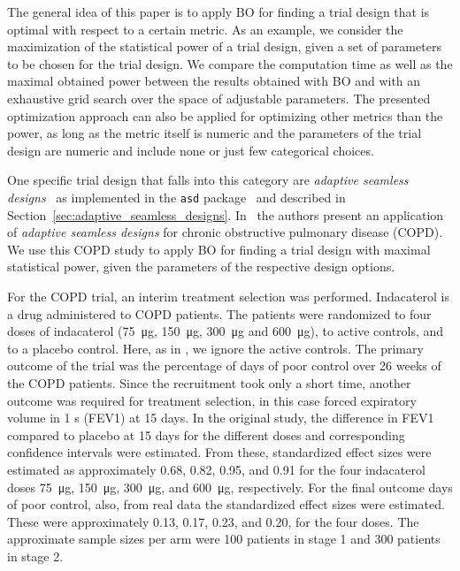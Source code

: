 \documentclass[bimj,fleqn]{w-art}
\theoremstyle{plain}
\theoremstyle{definition}
\begin{document}
The general idea of this paper is to apply BO for finding a trial design that is optimal with respect to a certain metric.
As an example, we consider the maximization of the statistical power of a trial design, given a set of parameters to be chosen for the trial design.
We compare the computation time as well as the maximal obtained power between the results obtained with BO and with an exhaustive grid search over the space of adjustable parameters.
The presented optimization approach can also be applied for optimizing other metrics than the power, as long as the metric itself is numeric and the parameters of the trial design are numeric and include none or just few categorical choices.

One specific trial design that falls into this category are \emph{adaptive seamless designs}~\citep{barnes_integrating_2010} as implemented in the \texttt{asd} package~\citep{parsons_package_2012} and described in Section~\ref{sec:adaptive_seamless_designs}.
In~\citet{friede_adaptive_2020} the authors present an application of \emph{adaptive seamless designs} for chronic obstructive pulmonary disease (COPD).
We use this COPD study to apply BO for finding a trial design with maximal statistical power, given the parameters of the respective design options.


For the COPD trial, an interim treatment selection was performed. 
Indacaterol is a drug administered to COPD patients.
The patients were randomized to four doses of indacaterol (\SI{75}{\micro\gram}, \SI{150}{\micro\gram}, \SI{300}{\micro\gram} and \SI{600}{\micro\gram}), to active controls, and to a placebo control.
Here, as in \citet{friede_adaptive_2020}, we ignore the active controls.
The primary outcome of the trial was the percentage of days of poor control over 26 weeks of the COPD patients.
Since the recruitment took only a short time, another outcome was required for treatment selection, in this case forced expiratory volume in 1 s (FEV1) at 15 days.
In the original study, the difference in FEV1 compared to placebo at 15 days for the different doses and corresponding confidence intervals were estimated.
From these, standardized effect sizes were estimated as approximately 0.68, 0.82, 0.95, and 0.91 for the four indacaterol doses \SI{75}{\micro\gram}, \SI{150}{\micro\gram}, \SI{300}{\micro\gram}, and \SI{600}{\micro\gram}, respectively.
For the final outcome days of poor control, also, from real data the standardized effect sizes were estimated.
These were approximately 0.13, 0.17, 0.23, and 0.20, for the four doses.
The approximate sample sizes per arm were 100 patients in stage 1 and 300 patients in stage 2.
\end{document}
